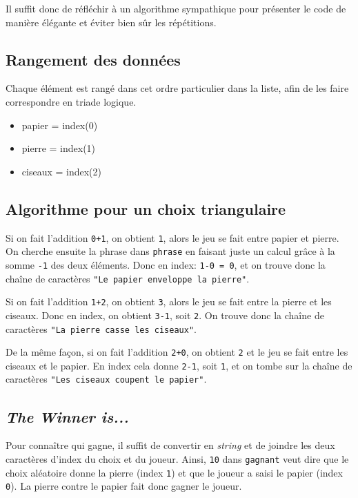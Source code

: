 Il suffit donc de réfléchir à un algorithme sympathique pour présenter le code de manière élégante et éviter bien sûr les répétitions.
\medskip

\subsection*{Rangement des données}
Chaque élément est rangé dans cet ordre particulier dans la liste, afin de les faire correspondre en triade logique.
\begin{itemize}
	\item[\textbullet] papier = index(0)
	\item[\textbullet] pierre = index(1)
	\item[\textbullet] ciseaux = index(2)
\end{itemize}
\medskip

\subsection*{Algorithme pour un choix triangulaire}
Si on fait l'addition \texttt{0+1}, on obtient \texttt{1}, alors le jeu se fait entre \og papier\fg{} et \og pierre\fg{}. On cherche ensuite la phrase dans \texttt{phrase} en faisant juste un calcul grâce à la somme \texttt{-1} des deux éléments. Donc en index:  \texttt{1-0 = 0}, et on trouve donc la chaîne de caractères \texttt{"Le papier enveloppe la pierre"}.
\medskip

Si on fait l'addition \texttt{1+2}, on obtient \texttt{3}, alors le jeu se fait entre la \og pierre\fg{} et les \og ciseaux\fg{}. Donc en index, on obtient \texttt{3-1}, soit \texttt{2}. On trouve donc la chaîne de caractères \texttt{"La pierre casse les ciseaux"}.
\medskip

De la même façon, si on fait l'addition \texttt{2+0}, on obtient \texttt{2} et le jeu se fait entre les \og ciseaux\fg{} et le \og papier\fg{}. En index cela donne \texttt{2-1}, soit \texttt{1}, et on tombe sur la chaîne de caractères \texttt{"Les ciseaux coupent le papier"}.
\medskip

\subsection*{\textit{The Winner is...}}
Pour connaître qui gagne, il suffit de convertir en \textit{string} et de joindre les deux caractères d'index du choix et du joueur. Ainsi, \texttt{10} dans \texttt{gagnant} veut dire que le choix aléatoire donne la \og pierre\fg{} (index \texttt{1}) et que le joueur a saisi le \og papier\fg{} (index \texttt{0}). La \og pierre\fg{} contre le \og papier\fg{} fait donc gagner le joueur.
\medskip

